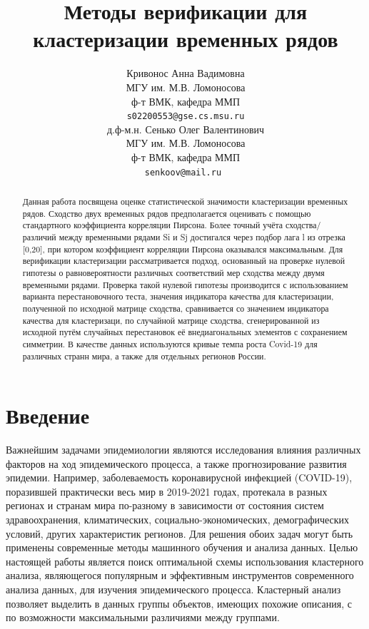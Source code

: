 \documentclass{article}
\title{Методы верификации для кластеризации временных рядов }
\author{ Кривонос Анна Вадимовна  \\
	МГУ им. М.В. Ломоносова\\
	ф-т ВМК, кафедра ММП\\
	\texttt{s02200553@gse.cs.msu.ru} \\
	\And
	д.ф-м.н. Сенько Олег Валентинович \\
	МГУ им. М.В. Ломоносова\\
	ф-т ВМК, кафедра ММП\\
	\texttt{senkoov@mail.ru } \\
}
\date{}
\begin{document}
\maketitle

\begin{abstract}
	Данная работа посвящена оценке статистической значимости кластеризации временных рядов. Сходство двух временных рядов  предполагается оценивать с помощью стандартного коэффициента корреляции Пирсона. Более точный учёта сходства/различий между
    временными рядами Si и Sj достигался через подбор лага l из отрезка [0,20], при котором коэффициент корреляции Пирсона оказывался максимальным. Для верификации кластеризации рассматривается подход, основанный на проверке нулевой гипотезы о равновероятности различных соответствий мер сходства между двумя временными рядами. Проверка такой нулевой гипотезы производится с использованием варианта перестановочного теста, значения индикатора качества для кластеризации, полученной по исходной матрице сходства, сравнивается со значением индикатора качества для кластеризаци, по случайной матрице сходства, сгенерированной из исходной путём случайных перестановок её внедиагональных элементов с сохранением симметрии. В качестве данных используются кривые темпа роста Covid-19 для различных странн мира, а также для отдельных регионов России.
\end{abstract}



\section{Введение}
Важнейшим задачами эпидемиологии являются исследования влияния различных факторов на ход эпидемического процесса, а также прогнозирование развития эпидемии. Например, заболеваемость коронавирусной инфекцией (COVID-19), поразившей практически весь мир в 2019-2021 годах, протекала в разных регионах и странам мира по-разному в зависимости от состояния систем здравоохранения, климатических, социально-экономических, демографических условий, других характеристик регионов. Для решения обоих задач могут быть применены современные методы машинного обучения и анализа данных. Целью настоящей работы является поиск оптимальной схемы использования кластерного анализа, являющегося популярным и эффективным инструментов современного анализа данных, для изучения эпидемического процесса. Кластерный анализ позволяет выделить в данных группы объектов, имеющих похожие описания, с по возможности максимальными различиями между группами. 
\end{document}
